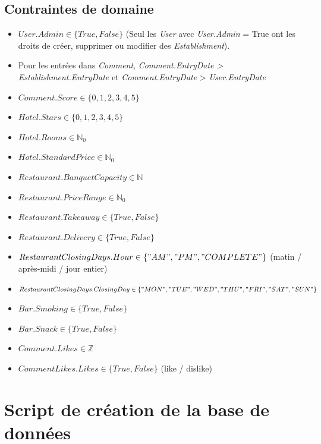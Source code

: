 \documentclass[11pt,a4paper]{report}
\begin{document}
\subsection*{Contraintes de domaine}
\begin{itemize}
\item $User.Admin \in \{True,False\} $ (Seul les \textit{User} avec \textit{User.Admin} = True ont les droits de créer, supprimer ou modifier des \textit{Establishment}).
\item Pour les entrées dans \textit{Comment}, \textit{Comment.EntryDate > Establishment.EntryDate} et \textit{Comment.EntryDate} > \textit{User.EntryDate}
\item $Comment.Score \in \{0,1,2,3,4,5\}$
\item $Hotel.Stars \in \{0,1,2,3,4,5\}$
\item $Hotel.Rooms \in \mathbb{N}_{0}$
\item $Hotel.StandardPrice \in \mathbb{N}_{0}$
\item $Restaurant.BanquetCapacity \in \mathbb{N} $
\item $Restaurant.PriceRange \in \mathbb{N}_{0}$
\item $Restaurant.Takeaway \in \{True,False\} $
\item $Restaurant.Delivery \in \{True,False\} $
\item $RestaurantClosingDays.Hour \in \{"AM","PM","COMPLETE" \}$ (matin / après-midi / jour entier)
\item $RestaurantClosingDays.ClosingDay \in \{"MON","TUE","WED","THU","FRI","SAT","SUN" \} $
\item $Bar.Smoking \in \{True,False\} $
\item $Bar.Snack \in \{True,False\} $
\item $Comment.Likes \in \mathbb{Z} $
\item $CommentLikes.Likes \in \{True,False\} $ (like / dislike)

\end{itemize}

\section*{Script de création de la base de données}
\end{document}
